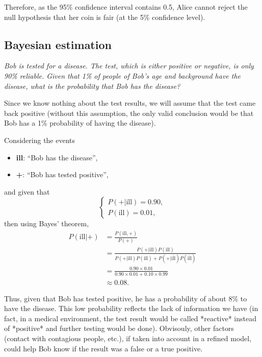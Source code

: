 \documentclass[12pt]{article}
\begin{document}
  Therefore, as the 95\% confidence interval contains 0.5, Alice cannot reject
  the null hypothesis that her coin is fair (at the 5\% confidence level).
  
  \subsection{Bayesian estimation}

  \begin{displayquote}
    \itshape{}
    Bob is tested for a disease. The test, which is either positive or
    negative, is only 90\% reliable. Given that 1\% of people of Bob’s age and
    background have the disease, what is the probability that Bob has the
    disease?
  \end{displayquote}

  Since we know nothing about the test results, we will assume that the test
  came back positive (without this assumption, the only valid conclusion would
  be that Bob has a 1\% probability of having the disease).

  Considering the events 
  \begin{itemize}
    \item \textbf{ill}: ``Bob has the disease'',
    \item \textbf{+}: ``Bob has tested positive'',
  \end{itemize}
  and given that 
  \begin{equation}
    \begin{cases}
      P(+ | \text{ill}) = 0.90,\\
      P(\text{ill}) = 0.01,
    \end{cases}
  \end{equation}
  then using Bayes' theorem,
  \begin{equation}
    \begin{split}
      P(\text{ill} | +) &= \frac{P(\text{ill}, +)}{P(+)}\\
      &= \frac{P(+ | \text{ill}) P(\text{ill})}{P(+ | \text{ill})P(\text{ill})
        + P(+ | \overline{\text{ill}})P(\overline{\text{ill}})}\\
      &= \frac{0.90 \times 0.01}{0.90 \times 0.01 + 0.10 \times 0.99}\\
      &\approx 0.08.
    \end{split}
  \end{equation}

  Thus, given that Bob has tested positive, he has a probability of about 8\%
  to have the disease. This low probability reflects the lack of information we
  have (in fact, in a medical environment, the test result would be called
  *reactive* instead of *positive* and further testing would be done).
  Obvisouly, other factors (contact with contagious people, etc.), if taken
  into account in a refined model, could help Bob know if the result was a
  false or a true positive.
\end{document}
